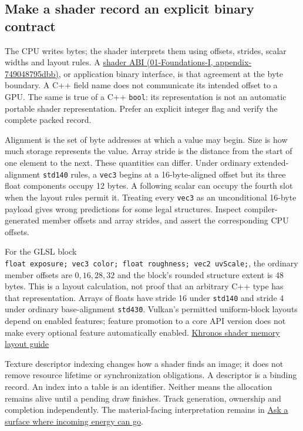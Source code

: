 \subsection{Make a shader record an explicit binary contract}\label{make-a-shader-record-an-explicit-binary-contract}

The CPU writes bytes; the shader interprets them using offsets, strides, scalar widths and layout rules. A \href{}{shader ABI (01-Foundations-I, appendix-749048795dbb)}, or application binary interface, is that agreement at the byte boundary. A C++ field name does not communicate its intended offset to a GPU. The same is true of a C++ \texttt{bool}: its representation is not an automatic portable shader representation. Prefer an explicit integer flag and verify the complete packed record.

Alignment is the set of byte addresses at which a value may begin. Size is how much storage represents the value. Array stride is the distance from the start of one element to the next. These quantities can differ. Under ordinary extended-alignment \texttt{std140} rules, a \texttt{vec3} begins at a 16-byte-aligned offset but its three float components occupy 12 bytes. A following scalar can occupy the fourth slot when the layout rules permit it. Treating every \texttt{vec3} as an unconditional 16-byte payload gives wrong predictions for some legal structures. Inspect compiler-generated member offsets and array strides, and assert the corresponding CPU offsets.

For the GLSL block \texttt{float\ exposure;\ vec3\ color;\ float\ roughness;\ vec2\ uvScale;}, the ordinary member offsets are \(0,16,28,32\) and the block's rounded structure extent is 48 bytes. This is a layout calculation, not proof that an arbitrary C++ type has that representation. Arrays of floats have stride 16 under \texttt{std140} and stride 4 under ordinary base-alignment \texttt{std430}. Vulkan's permitted uniform-block layouts depend on enabled features; feature promotion to a core API version does not make every optional feature automatically enabled. \href{https://docs.vulkan.org/guide/latest/shader_memory_layout.html}{Khronos shader memory layout guide}

Texture descriptor indexing changes how a shader finds an image; it does not remove resource lifetime or synchronization obligations. A descriptor is a binding record. An index into a table is an identifier. Neither means the allocation remains alive until a pending draw finishes. Track generation, ownership and completion independently. The material-facing interpretation remains in \hyperref[03-visual-computing-i-ch005]{Ask a surface where incoming energy can go}.

